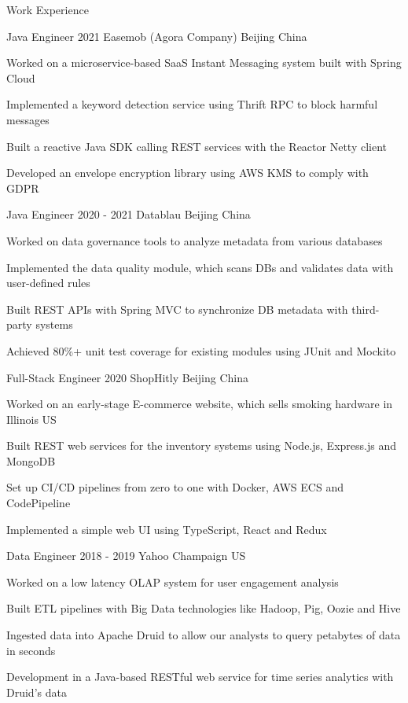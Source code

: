 \documentclass{resume} %
\begin{document}
\begin{rSection}{Work Experience}

\begin{rSubsection}
{Java Engineer} {2021} {Easemob (Agora Company)} {Beijing China}
\item Worked on a microservice-based SaaS Instant Messaging system built with Spring Cloud
\item Implemented a keyword detection service using Thrift RPC to block harmful messages
\item Built a reactive Java SDK calling REST services with the Reactor Netty client
\item Developed an envelope encryption library using AWS KMS to comply with GDPR
\end{rSubsection}

\begin{rSubsection}
{Java Engineer} {2020 - 2021} {Datablau} {Beijing China}
\item Worked on data governance tools to analyze metadata from various databases
\item Implemented the data quality module, which scans DBs and validates data with user-defined rules
\item Built REST APIs with Spring MVC to synchronize DB metadata with third-party systems
\item Achieved 80\%+ unit test coverage for existing modules using JUnit and Mockito
\end{rSubsection}

\begin{rSubsection}
{Full-Stack Engineer} {2020} {ShopHitly} {Beijing China}
\item Worked on an early-stage E-commerce website, which sells smoking hardware in Illinois US
\item Built REST web services for the inventory systems using Node.js, Express.js and MongoDB
\item Set up CI/CD pipelines from zero to one with Docker, AWS ECS and CodePipeline
\item Implemented a simple web UI using TypeScript, React and Redux
\end{rSubsection}

\begin{rSubsection}
{Data Engineer} {2018 - 2019} {Yahoo} {Champaign US}
\item Worked on a low latency OLAP system for user engagement analysis
\item Built ETL pipelines with Big Data technologies like Hadoop, Pig, Oozie and Hive
\item Ingested data into Apache Druid to allow our analysts to query petabytes of data in seconds
\item Development in a Java-based RESTful web service for time series analytics with Druid's data
\end{rSubsection}

\end{rSection}
\end{document}
